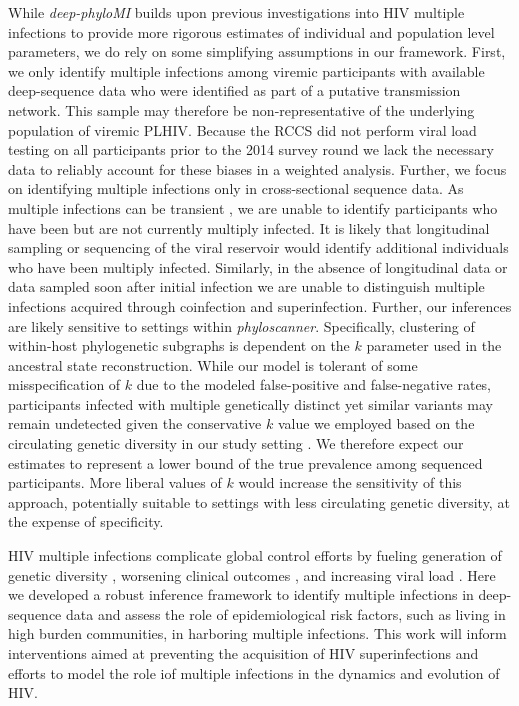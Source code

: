 \documentclass[10pt,letterpaper]{article}
\begin{document}
While \textit{deep-phyloMI} builds upon previous investigations into HIV multiple infections to provide more rigorous estimates of individual and population level parameters, we do rely on some simplifying assumptions in our framework. First, we only identify multiple infections among viremic participants with available deep-sequence data who were identified as part of a putative transmission network. This sample may therefore be non-representative of the underlying population of viremic PLHIV. Because the RCCS did not perform viral load testing on all participants prior to the 2014 survey round we lack the necessary data to reliably account for these biases in a weighted analysis. Further, we focus on identifying multiple infections only in cross-sectional sequence data. As multiple infections can be transient \cite{ronen2013}, we are unable to identify participants who have been but are not currently multiply infected. It is likely that longitudinal sampling or sequencing of the viral reservoir would identify additional individuals who have been multiply infected. Similarly, in the absence of longitudinal data or data sampled soon after initial infection we are unable to distinguish multiple infections acquired through coinfection and superinfection. Further, our inferences are likely sensitive to settings within \textit{phyloscanner}. Specifically, clustering of within-host phylogenetic subgraphs is dependent on the $k$ parameter used in the ancestral state reconstruction. While our model is tolerant of some misspecification of $k$ due to the modeled false-positive and false-negative rates, participants infected with multiple genetically distinct yet similar variants may remain undetected given the conservative $k$ value we employed based on the circulating genetic diversity in our study setting \cite{kim2024}. We therefore expect our estimates to represent a lower bound of the true prevalence among sequenced participants. More liberal values of $k$ would increase the sensitivity of this approach, potentially suitable to settings with less circulating genetic diversity, at the expense of specificity. \par

HIV multiple infections complicate global control efforts by fueling generation of genetic diversity \cite{ramirez2008}, worsening clinical outcomes \cite{gottlieb2004, smith2004}, and increasing viral load \cite{smith2004, ronen2013, janes2015}. Here we developed a robust inference framework to identify multiple infections in deep-sequence data and assess the role of epidemiological risk factors, such as living in high burden communities, in harboring multiple infections. This work will inform interventions aimed at preventing the acquisition of HIV superinfections and efforts to model the role iof multiple infections in the dynamics and evolution of HIV. 
\end{document}
